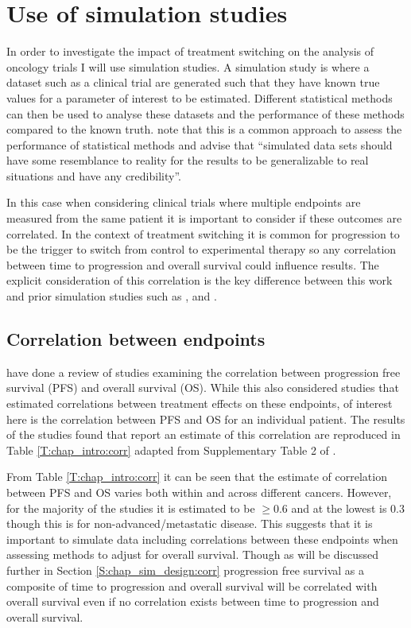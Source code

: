 \section{Use of simulation studies}
\label{S:chap_intro:simstudy}
In order to investigate the impact of treatment switching on the analysis of oncology trials I will use simulation studies. A simulation study is where a dataset such as a clinical trial are generated such that they have known true values for a parameter of interest to be estimated. Different statistical methods can then be used to analyse these datasets and the performance of these methods compared to the known truth. \cite{Burton2006} note that this is a common approach to assess the performance of statistical methods and advise that ``simulated data sets should have some resemblance to reality for the results to be generalizable to real situations and have any credibility''. 

In this case when considering clinical trials where multiple endpoints are measured from the same patient it is important to consider if these outcomes are correlated. In the context of treatment switching it is common for progression to be the trigger to switch from control to experimental therapy so any correlation between time to progression and overall survival could influence results. The explicit consideration of this correlation is the key difference between this work and prior simulation studies such as \cite{Morden2011}, \cite{Latimer2013} and \cite{Latimer2016}.

\subsection{Correlation between endpoints}
\label{S:chap_intro:correlation}

\cite{Ciani2014} have done a review of studies examining the correlation between progression free survival (PFS) and overall survival (OS). While this also considered studies that estimated correlations between treatment effects on these endpoints, of interest here is the correlation between PFS and OS for an individual patient. The results of the studies found that report an estimate of this correlation are reproduced in Table \ref{T:chap_intro:corr} adapted from Supplementary Table 2 of \cite{Ciani2014}. 


From Table \ref{T:chap_intro:corr} it can be seen that the estimate of correlation between PFS and OS varies both within and across different cancers. However, for the majority of the studies it is estimated to be $\ge 0.6$ and at the lowest is $0.3$ though this is for non-advanced/metastatic disease. This suggests that it is important to simulate data including correlations between these endpoints when assessing methods to adjust for overall survival. Though as will be discussed further in Section \ref{S:chap_sim_design:corr} progression free survival as a composite of time to progression and overall survival will be correlated with overall survival even if no correlation exists between time to progression and overall survival.

